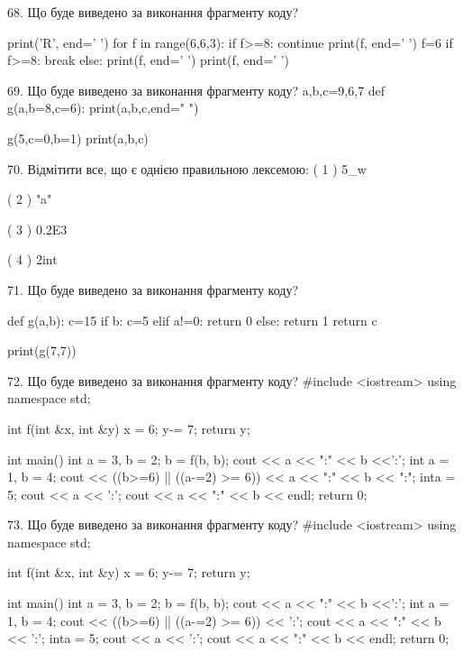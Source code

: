 \documentclass[11pt]{article}
\begin{document}
68. Що буде виведено за виконання фрагменту коду?

print('R', end=' ')
for f in range(6,6,3):
    if f>=8:
        continue
        print(f, end=' ')
        f=6
    if f>=8:
        break
    else:
        print(f, end=' ')
    print(f, end=' ')
\vspace{5mm}

69. Що буде виведено за виконання фрагменту коду?
a,b,c=9,6,7
def g(a,b=8,c=6):
    print(a,b,c,end=" ")

g(5,c=0,b=1)
print(a,b,c)
\vspace{5mm}

70. %
Відмітити все, що є однією правильною лексемою:
( 1 ) 5_w

( 2 ) "a\na"

( 3 ) 0.2E3

( 4 ) 2int
\vspace{5mm}

71. Що буде виведено за виконання фрагменту коду?

def g(a,b):
    c=15
    if b:
        c=5
    elif a!=0:
         return 0
    else: 
        return 1
    return c

print(g(7,7))
\vspace{5mm}

72. Що буде виведено за виконання фрагменту коду?
#include <iostream>
using namespace std;

int f(int &x, int &y){
    x = 6;
    y-= 7;
    return y;
}

int main(){
    int a = 3, b = 2;
    b = f(b, b);
    cout << a << ":" << b <<':';
    {
        int a = 1, b = 4;
        cout << ((b>=6) || ((a-=2) >= 6))
             << a << ":" << b << ":";
    }
    {
        inta = 5;
        cout << a << ':';
    }
    cout << a << ":" << b << endl;
    return 0;
}

\vspace{5mm}

73. Що буде виведено за виконання фрагменту коду?
#include <iostream>
using namespace std;

int f(int &x, int &y){
    x = 6;
    y-= 7;
    return y;
}

int main(){
    int a = 3, b = 2;
    b = f(b, b);
    cout << a << ":" << b <<':';
    {
        int a = 1, b = 4;
        cout << ((b>=6) || ((a-=2) >= 6)) << ':';
        cout << a << ":" << b << ':';
    }
    {
        inta = 5;
        cout << a << ':';
    }
    cout << a << ":" << b << endl;
    return 0;
}
\end{document}
